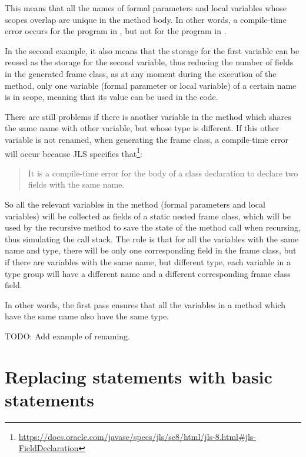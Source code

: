 This means that all the names of formal parameters and local variables whose scopes overlap are unique in the method
body. In other words, a compile-time error occurs for the program in
, but not for the program in
.


In the second example, it also means that the storage for the first  variable can be reused as the storage for
the second  variable, thus reducing the number of fields in the generated frame class, as at any moment during
the execution of the method, only one variable (formal parameter or local variable) of a certain name is in scope,
meaning that its value can be used in the code.

There are still problems if there is another variable in the method which shares the same name with other variable, but
whose type is different. If this other variable is not renamed, when generating the frame class, a compile-time error
will occur because JLS specifies that\footnote{\url{https://docs.oracle.com/javase/specs/jls/se8/html/jls-8.html#jls-FieldDeclaration}}:
\begin{quote}
    It is a compile-time error for the body of a class declaration to declare two fields with the same name.
\end{quote}

So all the relevant variables in the method (formal parameters and local variables) will be collected as fields of a
static nested frame class, which will be used by the recursive method to save the state of the method call when
recursing, thus simulating the call stack. The rule is that for all the variables with the same name and type, there
will be only one corresponding field in the frame class, but if there are variables with the same name, but different
type, each variable in a type group will have a different name and a different corresponding frame class field.

In other words, the first pass ensures that all the variables in a method which have the same name also have the same
type.

TODO: Add example of renaming.

\section{Replacing  statements with basic  statements}

